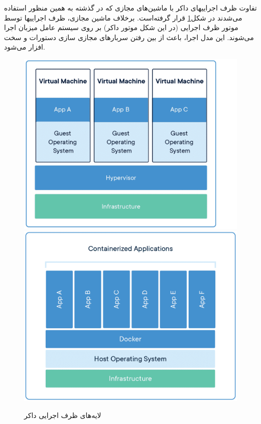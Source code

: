 تفاوت ظرف اجراییهای داکر با ماشین‌های مجازی که در گذشته به همین منظور استفاده می‌شدند در شکل\ref{fig:docker-container-vm}‌ قرار گرفته‌است. برخلاف ماشین مجازی، ظرف اجراییها توسط موتور ظرف اجرایی (در این شکل موتور داکر) بر روی سیستم عامل میزبان اجرا می‌شوند. این مدل اجرا، باعث از بین  رفتن سربارهای مجازی سازی دستورات و سخت افزار می‌شود.

\begin{figure}[h]
	\vspace{1cm}
	\centering
	\includegraphics[scale=0.17]{figures/container-vm-whatcontainer.png}
	\includegraphics[scale=0.17]{figures/docker-containerized-appliction-blue-border.png}
	\caption{لایه‌های ظرف اجرایی داکر}
	\label{fig:docker-container-vm}
\end{figure}


